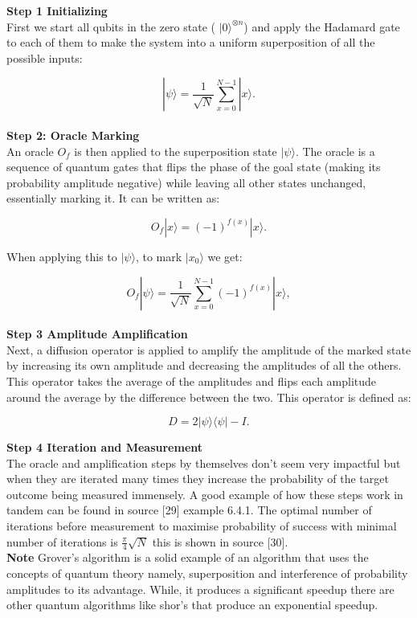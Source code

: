 \noindent\textbf{Step 1 Initializing}\\
\noindent First we start all qubits in the zero state ( \( |0\rangle^{\otimes n} \)) and apply the Hadamard gate to each of them to make the system into a uniform superposition of all the possible inputs:

\[
|\psi\rangle = \frac{1}{\sqrt{N}} \sum_{x=0}^{N-1} |x\rangle.
\]\\

\noindent\textbf{Step 2: Oracle Marking}\\
\noindent An oracle \( O_f \) is then applied to the superposition state $|\psi\rangle$. The oracle is a sequence of quantum gates that flips the phase of the goal state (making its probability amplitude negative) while leaving all other states unchanged, essentially marking it. It can be written as:

\[
O_f |x\rangle = (-1)^{f(x)} |x\rangle.
\]

\noindent When applying this to $|\psi\rangle$, to mark \( |x_0\rangle \) we get:

\[
O_f |\psi\rangle = \frac{1}{\sqrt{N}} \sum_{x=0}^{N-1} (-1)^{f(x)} |x\rangle,
\]\\
\noindent\textbf{Step 3 Amplitude Amplification}\\
\noindent Next, a diffusion operator is applied to amplify the amplitude of the marked state by increasing its own amplitude and decreasing the amplitudes of all the others. This operator takes the average of the amplitudes and flips each amplitude around the average by the difference between the two. This operator is defined as:

\[
D = 2|\psi\rangle\langle\psi| - I.
\]

\noindent\textbf{Step 4 Iteration and Measurement}\\
\noindent The oracle and amplification steps by themselves don't seem very impactful but when they are iterated many times they increase the probability of the target outcome being measured immensely. A good example of how these steps work in tandem can be found in source [29] example 6.4.1. The optimal number of iterations before measurement to maximise probability of success with minimal number of iterations is $\frac{\pi}{4} \sqrt{N}
$ this is shown in source [30]. \\

\noindent\textbf{Note }Grover's algorithm is a solid example of an algorithm that uses the concepts of quantum theory namely, superposition and interference of probability amplitudes to its advantage. While, it produces a significant speedup there are other quantum algorithms like shor's that produce an exponential speedup.





